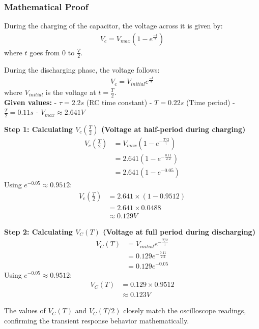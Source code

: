 \documentclass[journal]{IEEEtran}
\begin{document}
\subsubsection{Mathematical Proof}

During the charging of the capacitor, the voltage across it is given by:
\begin{align*}
    V_c = V_{max}\left(1 - e^{\frac{-t}{\tau}}\right)
\end{align*}
where $t$ goes from $0$ to $\frac{T}{2}$.

During the discharging phase, the voltage follows:
\begin{align*}
    V_c = V_{initial} e^{\frac{-t}{\tau}}
\end{align*}
where $V_{initial}$ is the voltage at $t = \frac{T}{2}$.\\

\textbf{Given values:}
- $\tau = 2.2s$ (RC time constant)
- $T = 0.22s$ (Time period)
- $\frac{T}{2} = 0.11s$
- $V_{max} \approx 2.641V$

\textbf{Step 1: Calculating $V_c(\frac{T}{2})$ (Voltage at half-period during charging)}
\begin{align*}
    V_c(\frac{T}{2}) &= V_{max}\left(1 - e^{-\frac{T/2}{\tau}}\right) \\
    &= 2.641 \left(1 - e^{-\frac{0.11}{2.2}}\right) \\
    &= 2.641 \left(1 - e^{-0.05}\right)
\end{align*}
Using $e^{-0.05} \approx 0.9512$:
\begin{align*}
    V_c(\frac{T}{2}) &= 2.641 \times (1 - 0.9512) \\
    &= 2.641 \times 0.0488 \\
    &\approx 0.129V
\end{align*}

\textbf{Step 2: Calculating $V_C(T)$ (Voltage at full period during discharging)}
\begin{align*}
    V_C(T) &= V_{initial} e^{-\frac{T/2}{\tau}} \\
    &= 0.129 e^{-\frac{0.11}{2.2}} \\
    &= 0.129 e^{-0.05}
\end{align*}
Using $e^{-0.05} \approx 0.9512$:
\begin{align*}
    V_C(T) &= 0.129 \times 0.9512 \\
    &\approx 0.123V
\end{align*}

The values of $V_C(T)$ and $V_C(T/2)$ closely match the oscilloscope readings, confirming the transient response behavior mathematically.
\end{document}
